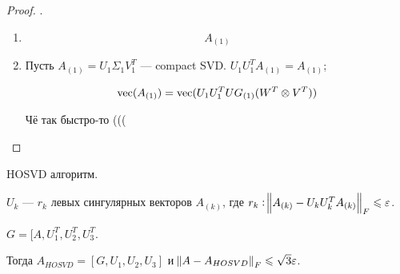 \begin{proof} .
    \begin{enumerate}
        \item
            \[
                A_{(1)}
            \]
        \item Пусть $A_{(1)} = U_1 \Sigma_1 V_1^T$ --- compact SVD.
            $U_1 U_1^T A_{(1)} = A_{(1)}$;

            \[
                \operatorname{vec}(A_{(1)}) = \operatorname{vec}(U_1 U_1^T U G_{(1)} (W^T \otimes V^T))
            \]

            Чё так быстро-то (((
    \end{enumerate}
\end{proof}

HOSVD алгоритм.

$U_k$ --- $r_k$ левых сингулярных векторов $A_{(k)}$, где $r_k: \norm{A_{(k)} -
U_k U_k^T A_{(k)}}_F \leqslant \varepsilon$.

$G = [A, U_1^T, U_2^T, U_3^T$.

Тогда $A_{HOSVD} = [G, U_1, U_2, U_3]$ и $\norm{A - A_{HOSVD}}_F \leqslant \sqrt{3}
\varepsilon$.

